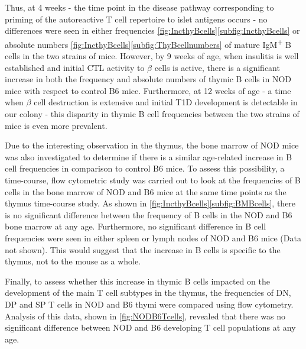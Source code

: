Thus, at 4 weeks - the time point in the disease pathway corresponding to priming of the autoreactive T cell repertoire to islet antigens occurs - no differences were seen in either frequencies \cref{fig:IncthyBcells}\ref{subfig:IncthyBcells} or absolute numbers \cref{fig:IncthyBcells}\ref{subfig:ThyBcellnumbers} of mature IgM\textsuperscript{+} B cells in the two strains of mice. 
However, by 9 weeks of age, when insulitis is well established and initial CTL activity to $\beta$ cells is active, there is a significant increase in both the frequency and absolute numbers of thymic B cells in NOD mice with respect to control B6 mice. 
Furthermore, at 12 weeks of age - a time when $\beta$ cell destruction is extensive and initial T1D development is detectable in our colony - this disparity in thymic B cell frequencies between the two strains of mice is even more prevalent.


Due to the interesting observation in the thymus, the bone marrow of NOD mice was also investigated to determine if there is a similar age-related increase in B cell frequencies in comparison to control B6 mice.
To assess this possibility, a time-course, flow cytometric study was carried out to look at the frequencies of B cells in the bone marrow of NOD and B6 mice at the same time points as the thymus time-course study.
As shown in \cref{fig:IncthyBcells}\ref{subfig:BMBcells}, there is no significant difference between the frequency of B cells in the NOD and B6 bone marrow at any age.
Furthermore, no significant difference in B cell frequencies were seen in either spleen or lymph nodes of NOD and B6 mice (Data not shown).
This would suggest that the increase in B cells is specific to the thymus, not to the mouse as a whole.

Finally, to assess whether this increase in thymic B cells impacted on the development of the main T cell subtypes in the thymus, the frequencies of DN, DP and SP T cells in NOD and B6 thymi were compared using flow cytometry.
Analysis of this data, shown in \cref{fig:NODB6Tcells}, revealed that there was no significant difference between NOD and B6 developing T cell populations at any age.

